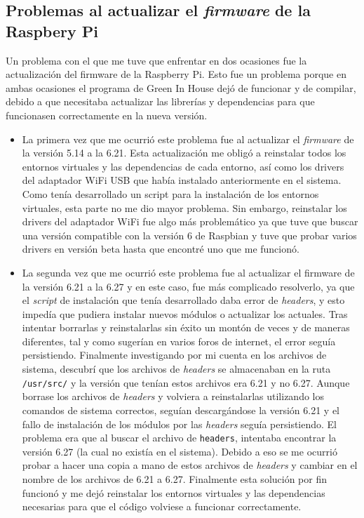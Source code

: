     \subsection{Problemas al actualizar el \textit{firmware} de la Raspbery Pi}
    Un problema con el que me tuve que enfrentar en dos ocasiones fue la actualización del firmware de la Raspberry Pi. Esto fue un problema porque en ambas ocasiones el programa de Green In House dejó de funcionar y de compilar, debido a que necesitaba actualizar las librerías y dependencias para que funcionasen correctamente en la nueva versión.
    \begin{itemize}
        \item     La primera vez que me ocurrió este problema fue al actualizar el \textit{firmware} de la versión 5.14 a la 6.21. Esta actualización me obligó a reinstalar todos los entornos virtuales y las dependencias de cada entorno, así como los drivers del adaptador WiFi USB que había instalado anteriormente en el sistema. Como tenía desarrollado un script para la instalación de los entornos virtuales, esta parte no me dio mayor problema. Sin embargo, reinstalar los drivers del adaptador WiFi fue algo más problemático ya que tuve que buscar una versión compatible con la versión 6 de Raspbian y tuve que probar varios drivers en versión beta hasta que encontré uno que me funcionó.
        \item La segunda vez que me ocurrió este problema fue al actualizar el firmware de la versión 6.21 a la 6.27 y en este caso, fue más complicado resolverlo, ya que el \textit{script} de instalación que tenía desarrollado daba error de \textit{headers}, y esto impedía que pudiera instalar nuevos módulos o actualizar los actuales. Tras intentar borrarlas y reinstalarlas sin éxito un montón de veces y de maneras diferentes, tal y como sugerían en varios foros de internet, el error seguía persistiendo. Finalmente investigando por mi cuenta en los archivos de sistema, descubrí que los archivos de \textit{headers} se almacenaban en la ruta \texttt{/usr/src/} y la versión que tenían estos archivos era 6.21 y no 6.27. Aunque borrase los archivos de \textit{headers} y volviera a reinstalarlas utilizando los comandos de sistema correctos, seguían descargándose la versión 6.21 y el fallo de instalación de los módulos por las \textit{headers} seguía persistiendo. El problema era que al buscar el archivo de \texttt{headers}, intentaba encontrar la versión 6.27 (la cual no existía en el sistema). Debido a eso se me ocurrió probar a hacer una copia a mano de estos archivos de \textit{headers} y cambiar en el nombre de los archivos de 6.21 a 6.27. Finalmente esta solución por fin funcionó y me dejó reinstalar los entornos virtuales y las dependencias necesarias para que el código volviese a funcionar correctamente.
    \end{itemize}
    

